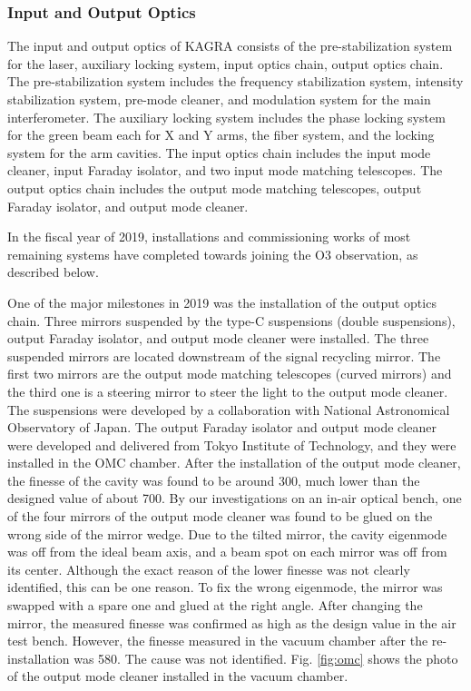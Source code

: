 \vspace{10pt}
\subsubsection*{\bf Input and Output Optics}

\vspace{3pt}

\vspace{3pt}

The input and output optics of KAGRA consists of the pre-stabilization system for the laser, auxiliary locking system, input optics chain, output optics chain. The pre-stabilization system includes the frequency stabilization system, intensity stabilization system, pre-mode cleaner, and modulation system for the main interferometer. The auxiliary locking system includes the phase locking system for the green beam each for X and Y arms, the fiber system, and the locking system for the arm cavities. The input optics chain includes the input mode cleaner, input Faraday isolator, and two input mode matching telescopes. The output optics chain includes the output mode matching telescopes, output Faraday isolator, and output mode cleaner. 

In the fiscal year of 2019, installations and commissioning works of most remaining systems have completed towards joining the O3 observation, as described below.

One of the major milestones in 2019 was the installation of the output optics chain. Three mirrors suspended by the type-C suspensions (double suspensions), output Faraday isolator, and output mode cleaner were installed. The three suspended mirrors are located downstream of the signal recycling mirror. The first two mirrors are the output mode matching telescopes (curved mirrors) and the third one is a steering mirror to steer the light to the output mode cleaner. The suspensions were developed by a collaboration with National Astronomical Observatory of Japan. The output Faraday isolator and output mode cleaner were developed and delivered from Tokyo Institute of Technology, and they were installed in the OMC chamber.
After the installation of the output mode cleaner,
the finesse of the cavity was found to be around 300, much lower than the designed value of about 700.
By our investigations on an in-air optical bench,
one of the four mirrors of the output mode cleaner was found to be glued on the wrong side of the mirror wedge.
Due to the tilted mirror, the cavity eigenmode was off from the ideal beam axis,
and a beam spot on each mirror was off from its center.
Although the exact reason of the lower finesse was not clearly identified,
this can be one reason.
To fix the wrong eigenmode, the mirror was swapped with a spare one and glued at the right angle.
After changing the mirror, the measured finesse was confirmed as high as the design value in the air test bench.
However, the finesse measured in the vacuum chamber after the re-installation was 580.
The cause was not identified.
Fig. \ref{fig:omc} shows the photo of the output mode cleaner installed in the vacuum chamber.


